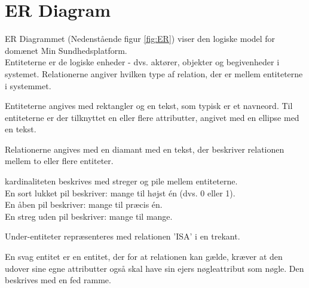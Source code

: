 \section{ER Diagram}
ER Diagrammet (Nedenstående figur \ref{fig:ER}) viser den logiske model for domænet Min Sundhedsplatform. \\
Entiteterne er de logiske enheder - dvs. aktører, objekter og begivenheder i systemet. 
Relationerne angiver hvilken type af relation, der er mellem entiteterne i systemmet.

Entiteterne angives med rektangler og en tekst, som typisk er et navneord. Til entiteterne er der tilknyttet en eller flere attributter, angivet med en ellipse med en tekst.

Relationerne angives med en diamant med en tekst, der beskriver relationen mellem to eller flere entiteter.

kardinaliteten beskrives med streger og pile mellem entiteterne. \\ 
En sort lukket pil beskriver: mange til højst én (dvs. 0 eller 1).\\
En åben pil beskriver: mange til præcis én.\\
En streg uden pil beskriver: mange til mange.

Under-entiteter repræsenteres med relationen 'ISA' i en trekant.

En svag entitet er en entitet, der for at relationen kan gælde, kræver at den udover sine egne attributter også skal have sin ejers nøgleattribut som nøgle. Den beskrives med en fed ramme.

